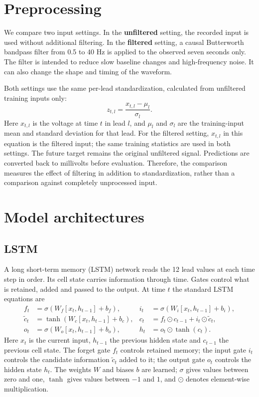 \documentclass[11pt,a4paper]{article}
\begin{document}
\section{Preprocessing}
We compare two input settings. In the \textbf{unfiltered} setting, the recorded input is used without additional filtering. In the \textbf{filtered} setting, a causal Butterworth bandpass filter from 0.5 to 40 Hz is applied to the observed seven seconds only. The filter is intended to reduce slow baseline changes and high-frequency noise. It can also change the shape and timing of the waveform.

Both settings use the same per-lead standardization, calculated from unfiltered training inputs only:
\begin{equation}
 z_{t,l}=\frac{x_{t,l}-\mu_l}{\sigma_l}.
\end{equation}
Here $x_{t,l}$ is the voltage at time $t$ in lead $l$, and $\mu_l$ and $\sigma_l$ are the training-input mean and standard deviation for that lead. For the filtered setting, $x_{t,l}$ in this equation is the filtered input; the same training statistics are used in both settings. The future target remains the original unfiltered signal. Predictions are converted back to millivolts before evaluation. Therefore, the comparison measures the effect of filtering in addition to standardization, rather than a comparison against completely unprocessed input.
\section{Model architectures}
\subsection{LSTM}
A long short-term memory (LSTM) network reads the 12 lead values at each time step in order. Its cell state carries information through time. Gates control what is retained, added and passed to the output. At time $t$ the standard LSTM equations are
\begin{align}
 f_t&=\sigma(W_f[x_t,h_{t-1}]+b_f), & i_t&=\sigma(W_i[x_t,h_{t-1}]+b_i),\\
 \widetilde c_t&=\tanh(W_c[x_t,h_{t-1}]+b_c), & c_t&=f_t\odot c_{t-1}+i_t\odot\widetilde c_t,\\
 o_t&=\sigma(W_o[x_t,h_{t-1}]+b_o), & h_t&=o_t\odot\tanh(c_t).
\end{align}
Here $x_t$ is the current input, $h_{t-1}$ the previous hidden state and $c_{t-1}$ the previous cell state. The forget gate $f_t$ controls retained memory; the input gate $i_t$ controls the candidate information $\widetilde c_t$ added to it; the output gate $o_t$ controls the hidden state $h_t$. The weights $W$ and biases $b$ are learned; $\sigma$ gives values between zero and one, $\tanh$ gives values between $-1$ and $1$, and $\odot$ denotes element-wise multiplication.
\end{document}
